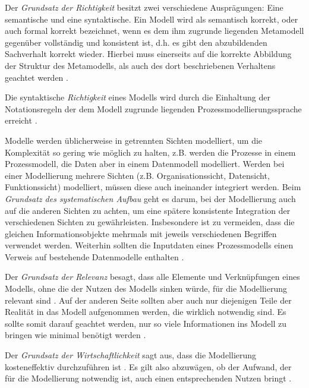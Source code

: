 Der \textit{Grundsatz der Richtigkeit} besitzt zwei verschiedene Ausprägungen: Eine semantische und eine syntaktische. Ein Modell wird als semantisch korrekt, oder auch formal korrekt bezeichnet, wenn es dem ihm zugrunde liegenden Metamodell gegenüber vollständig und konsistent ist, d.h. es gibt den abzubildenden Sachverhalt korrekt wieder. Hierbei muss einerseits auf die korrekte Abbildung der Struktur des Metamodells, als auch des dort beschriebenen Verhaltens geachtet werden \cite{journals95, becker2012prozessmanagement}. \newline

Die syntaktische \textit{Richtigkeit} eines Modells wird durch die Einhaltung der Notationsregeln der dem Modell zugrunde liegenden Prozessmodellierungssprache erreicht \cite{journals95, becker2012prozessmanagement}. \newline

Modelle werden üblicherweise in getrennten Sichten modelliert, um die Komplexität so gering wie möglich zu halten, z.B. werden die Prozesse in einem Prozessmodell, die Daten aber in einem Datenmodell modelliert. Werden bei einer Modellierung mehrere Sichten (z.B. Organisationssicht, Datensicht, Funktionssicht) modelliert, müssen diese auch ineinander integriert werden. Beim  \textit{Grundsatz des systematischen Aufbau} geht es darum, bei der Modellierung auch auf die anderen Sichten zu achten, um eine spätere konsistente Integration der verschiedenen Sichten zu gewährleisten. Insbesondere ist zu vermeiden, dass die gleichen Informationsobjekte mehrmals mit jeweils verschiedenen Begriffen verwendet werden. Weiterhin sollten die Inputdaten eines Prozessmodells einen Verweis auf bestehende Datenmodelle enthalten \cite{journals95, freund2007, becker2012prozessmanagement,koch2011}.\newline

Der \textit{Grundsatz der Relevanz} besagt, dass alle Elemente und Verknüpfungen eines Modells, ohne die der Nutzen des Modells sinken würde, für die Modellierung relevant sind \cite{journals95, reinshagen2009}. Auf der anderen Seite sollten aber auch nur diejenigen Teile der Realität in das Modell aufgenommen werden, die wirklich notwendig sind. Es sollte somit darauf geachtet werden, nur so viele Informationen ins Modell zu bringen wie minimal benötigt werden \cite{journals95, freund2007,reinshagen2009}.\newline

Der \textit{Grundsatz der Wirtschaftlichkeit} sagt aus, dass die Modellierung kosteneffektiv durchzuführen ist \cite{leimeister2012}. Es gilt also abzuwägen, ob der Aufwand, der für die Modellierung notwendig ist, auch einen entsprechenden Nutzen bringt \cite{freund2007, journals95}.\newline

